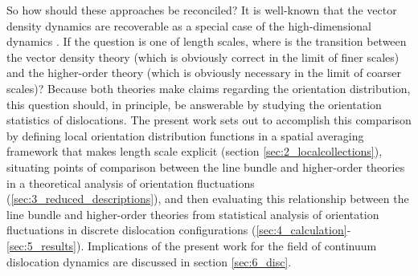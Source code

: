 So how should these approaches be reconciled? It is well-known that the vector density dynamics are recoverable as a special case of the high-dimensional dynamics \cite{Sedlacek2010,Hochrainer2010}. If the question is one of length scales, where is the transition between the vector density theory (which is obviously correct in the limit of finer scales) and the higher-order theory (which is obviously necessary in the limit of coarser scales)? Because both theories make claims regarding the orientation distribution, this question should, in principle, be answerable by studying the orientation statistics of dislocations. The present work sets out to accomplish this comparison by defining local orientation distribution functions in a spatial averaging framework that makes length scale explicit (section \ref{sec:2_localcollections}), situating points of comparison between the line bundle and higher-order theories in a theoretical analysis of orientation fluctuations (\ref{sec:3_reduced_descriptions}), and then evaluating this relationship between the line bundle and higher-order theories from statistical analysis of orientation fluctuations in discrete dislocation configurations (\ref{sec:4_calculation}-\ref{sec:5_results}). Implications of the present work for the field of continuum dislocation dynamics are discussed in section \ref{sec:6_disc}.
